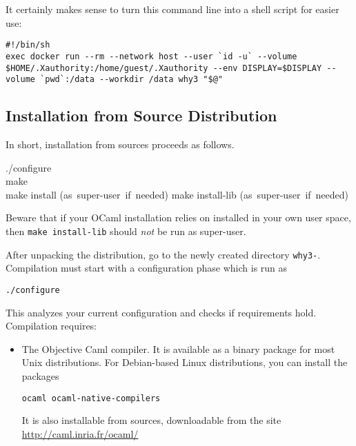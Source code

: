 It certainly makes sense to turn this command line into a shell script for easier use:
\begin{verbatim}
#!/bin/sh
exec docker run --rm --network host --user `id -u` --volume $HOME/.Xauthority:/home/guest/.Xauthority --env DISPLAY=$DISPLAY --volume `pwd`:/data --workdir /data why3 "$@"
\end{verbatim}

\subsection{Installation from Source Distribution}

In short, installation from sources proceeds as follows.
\begin{flushleft}\ttfamily
./configure\\
make\\
make install \mbox{\rmfamily (as super-user if needed)}
make install-lib \mbox{\rmfamily (as super-user if needed)}
\end{flushleft}
Beware that if your OCaml installation relies on \opam installed in
your own user space, then \texttt{make install-lib} should \emph{not}
be run as super-user.

After unpacking the distribution, go to the newly created directory
\texttt{why3-\whyversion}. Compilation must start with a
configuration phase which is run as
\begin{verbatim}
./configure
\end{verbatim}
This analyzes your current configuration and checks if requirements hold.
Compilation requires:
\begin{itemize}
\item The Objective Caml compiler. It is
  available as a binary package for most Unix distributions. For
  Debian-based Linux distributions, you can install the packages
\begin{verbatim}
ocaml ocaml-native-compilers
\end{verbatim}
It is also installable from sources, downloadable from the site
\url{http://caml.inria.fr/ocaml/}
\end{itemize}

